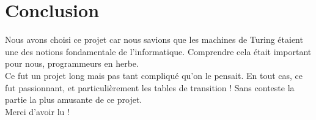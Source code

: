 \documentclass[a4paper,10pt]{article}
\begin{document}
\section{Conclusion}
    Nous avons choisi ce projet car nous savions que les machines de Turing étaient une des notions fondamentale de l'informatique. Comprendre cela était important pour nous, programmeurs en herbe.
    \\[1 em] 
    Ce fut un projet long mais pas tant compliqué qu'on le pensait. En tout cas, ce fut passionnant, et particulièrement les tables de transition ! Sans conteste la partie la plus amusante de ce projet.
    \\[1 em] 
    Merci d'avoir lu !
    \\[1 em] 
    
\end{document}
